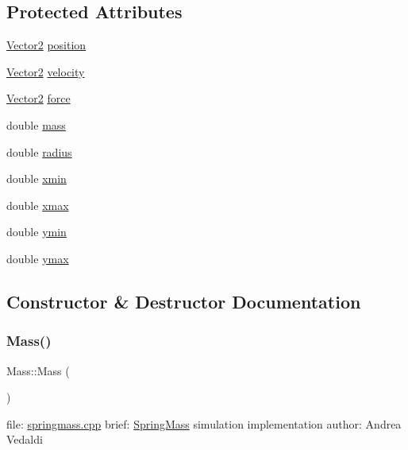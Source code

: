 \subsection*{Protected Attributes}
\begin{DoxyCompactItemize}
\item 
\hyperlink{classVector2}{Vector2} \hyperlink{classMass_a6a0d58d24ab413d10d0cee1f3fb82bf7}{position}
\item 
\hyperlink{classVector2}{Vector2} \hyperlink{classMass_ab3825e4083083ba184e5060303b913a7}{velocity}
\item 
\hyperlink{classVector2}{Vector2} \hyperlink{classMass_a0e78a40a61856046fe535f49c66ba04c}{force}
\item 
double \hyperlink{classMass_a8f37b93ded277000424b7a92adcf9c30}{mass}
\item 
double \hyperlink{classMass_afca87b38f7a4a6c4cfadbfba313dc4cf}{radius}
\item 
double \hyperlink{classMass_ad8c92b972c0c32e382bdd180cef9fa37}{xmin}
\item 
double \hyperlink{classMass_a6f2faa75c028993b95f07db8acbe1816}{xmax}
\item 
double \hyperlink{classMass_a994eea18acef1ab497634ae6c45e627a}{ymin}
\item 
double \hyperlink{classMass_a2d5d2f1659dfc4b43096e6f5140114cc}{ymax}
\end{DoxyCompactItemize}


\subsection{Constructor \& Destructor Documentation}
\mbox{\label{classMass_aa5d7017a4539bd4b76422cf193a0d23c}} 
\subsubsection{\texorpdfstring{Mass()}{Mass()}\hspace{0.1cm}{\footnotesize\ttfamily [1/2]}}
{\footnotesize\ttfamily Mass\+::\+Mass (\begin{DoxyParamCaption}{ }\end{DoxyParamCaption})}

file\+: \hyperlink{springmass_8cpp}{springmass.\+cpp} brief\+: \hyperlink{classSpringMass}{Spring\+Mass} simulation implementation author\+: Andrea Vedaldi \mbox{\label{classMass_adc27886a699de8add33229abb90a5469}} 
